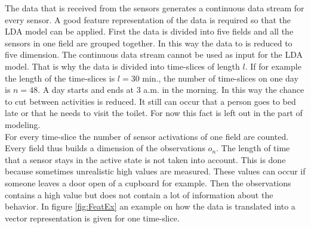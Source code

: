 The data that is received from the sensors generates a continuous data stream for every sensor. A good feature representation of the data is required so that the LDA model can be applied.
First the data is divided into five fields and all the sensors in one field are grouped together. In this way the data to is reduced to five dimension. The continuous data stream cannot be used as input for the LDA model. That is why the data is divided into time-slices of length $l$. If for example the length of the time-slices is $l=30$ min., the number of time-slices on one day is $n=48$.
A day starts and ends at 3 a.m. in the morning. In this way the chance to cut between activities is reduced. It still can occur that a person goes to bed late or that he needs to visit the toilet. For now this fact is left out in the part of modeling.\\

For every time-slice the number of sensor activations of one field are counted. Every field thus builds a dimension of the observations $o_n$. The length of time that a sensor stays in the active state is not taken into account. This is done because sometimes unrealistic high values are measured. These values can occur if someone leaves a door open of a cupboard for example. Then the observations contains a high value but does not contain a lot of information about the behavior. In figure \ref{fig:FeatEx} an example on how the data is translated into a vector representation is given for one time-slice.

